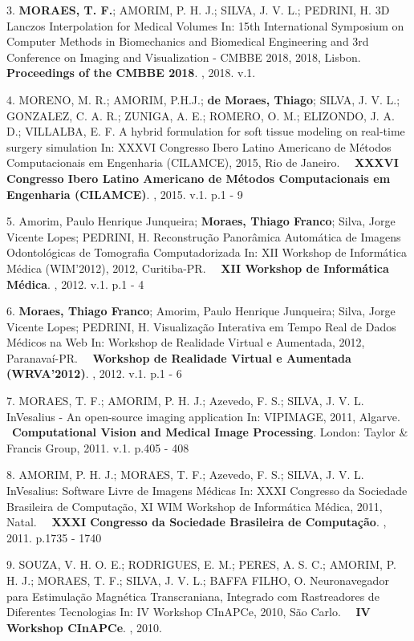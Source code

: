 3. \textbf{MORAES, T. F.}; AMORIM, P. H. J.; SILVA, J. V. L.; PEDRINI,
H.
3D Lanczos Interpolation for Medical Volumes In: 15th International
Symposium on Computer Methods in Biomechanics and Biomedical Engineering
and 3rd Conference on Imaging and Visualization - CMBBE 2018, 2018,
Lisbon.
    \textbf{Proceedings of the CMBBE 2018}. , 2018. v.1.

4. MORENO, M. R.; AMORIM, P.H.J.; \textbf{de Moraes, Thiago}; SILVA, J.
V. L.; GONZALEZ, C. A. R.; ZUNIGA, A. E.; ROMERO, O. M.; ELIZONDO, J. A.
D.; VILLALBA, E. F.
A hybrid formulation for soft tissue modeling on real-time surgery
simulation In: XXXVI Congresso Ibero Latino Americano de Métodos
Computacionais em Engenharia (CILAMCE), 2015, Rio de Janeiro.
    \textbf{XXXVI Congresso Ibero Latino Americano de Métodos
Computacionais em Engenharia (CILAMCE)}. , 2015. v.1. p.1 - 9

5. Amorim, Paulo Henrique Junqueira; \textbf{Moraes, Thiago Franco};
Silva, Jorge Vicente Lopes; PEDRINI, H.
Reconstrução Panorâmica Automática de Imagens Odontológicas de
Tomografia Computadorizada In: XII Workshop de Informática Médica
(WIM'2012), 2012, Curitiba-PR.
    \textbf{XII Workshop de Informática Médica}. , 2012. v.1. p.1 - 4

6. \textbf{Moraes, Thiago Franco}; Amorim, Paulo Henrique Junqueira;
Silva, Jorge Vicente Lopes; PEDRINI, H.
Visualização Interativa em Tempo Real de Dados Médicos na Web In:
Workshop de Realidade Virtual e Aumentada, 2012, Paranavaí-PR.
    \textbf{Workshop de Realidade Virtual e Aumentada (WRVA'2012)}. ,
2012. v.1. p.1 - 6

7. MORAES, T. F.; AMORIM, P. H. J.; Azevedo, F. S.; SILVA, J. V. L.
InVesalius - An open-source imaging application In: VIPIMAGE, 2011,
Algarve.
    \textbf{Computational Vision and Medical Image Processing}. London:
Taylor \& Francis Group, 2011. v.1. p.405 - 408

8. AMORIM, P. H. J.; MORAES, T. F.; Azevedo, F. S.; SILVA, J. V. L.
InVesalius: Software Livre de Imagens Médicas In: XXXI Congresso da
Sociedade Brasileira de Computação, XI WIM Workshop de Informática
Médica, 2011, Natal.
    \textbf{XXXI Congresso da Sociedade Brasileira de Computação}. ,
2011. p.1735 - 1740

9. SOUZA, V. H. O. E.; RODRIGUES, E. M.; PERES, A. S. C.; AMORIM, P. H.
J.; MORAES, T. F.; SILVA, J. V. L.; BAFFA FILHO, O.
Neuronavegador para Estimulação Magnética Transcraniana, Integrado com
Rastreadores de Diferentes Tecnologias In: IV Workshop CInAPCe, 2010,
São Carlo.
    \textbf{IV Workshop CInAPCe}. , 2010.

